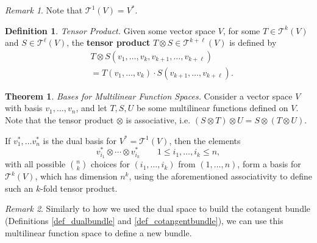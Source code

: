 \documentclass[10pt,landscape]{article}
\theoremstyle{definition}
\newtheorem{definition}{Definition}[section]
\theoremstyle{theorem}
\newtheorem{theorem}{Theorem}[section]
\theoremstyle{summary}
\theoremstyle{remark}
\newtheorem*{remark}{Remark}
\begin{document}
\begin{multicols*}{3}
\begin{remark}
    Note that $\mathcal{T}^1(V) = V^*$.
\end{remark}


\theoremstyle{definition}
\begin{definition}{\textit{Tensor Product.}}
    Given some vector space $V$, for some $T\in\mathcal{T}^k(V)$ and $S\in\mathcal{T}^\ell(V)$, the \textbf{tensor product} $T\otimes S\in\mathcal{T}^{k+\ell}(V)$ is defined by
    \begin{align}
        & T\otimes S (v_1,\ldots,v_k,v_{k+1},\ldots,v_{k+\ell}) \\
        & = T(v_1,\ldots,v_k)\cdot S(v_{k+1},\ldots,v_{k+\ell}).
    \end{align}
\end{definition}

\theoremstyle{theorem}
\begin{theorem}{\textit{Bases for Multilinear Function Spaces.}}
    \label{thm_basismultilinear}
    Consider a vector space $V$ with basis $v_1,\ldots,v_n$, and let $T, S, U$ be some multilinear functions defined on $V$. Note that the tensor product $\otimes$ is associative, i.e. $(S\otimes T)\otimes U = S\otimes (T\otimes U)$. 
    
    If $v_1^*,\ldots v_n^*$ is the dual basis for $V^*=\mathcal{T}^1(V)$, then the elements
    \begin{equation}
        v_{i_1}^*\otimes\cdots\otimes v_{i_k}^* \qquad 1\leq i_1,\ldots,i_k\leq n,
    \end{equation}
    with all possible $\binom{n}{k}$ choices for $(i_1,\ldots,i_k)$ from $(1,\ldots, n)$, form a basis for $\mathcal{T}^k(V)$, which has dimension $n^k$, using the aforementioned associativity to define such an $k$-fold tensor product.
\end{theorem}

\begin{remark}
    Similarly to how we used the dual space to build the cotangent bundle (Definitions \ref{def_dualbundle} and \ref{def_cotangentbundle}), we can use this multilinear function space to define a new bundle.
\end{remark}


\end{multicols*}
\end{document}
